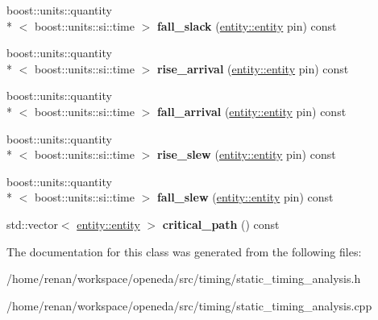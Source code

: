 \begin{DoxyCompactItemize}
\item 
\hypertarget{classophidian_1_1timing_1_1static__timing__analysis_a88ea07d77802e1c5293d17072092f7ab}{boost\-::units\-::quantity\\*
$<$ boost\-::units\-::si\-::time $>$ {\bfseries fall\-\_\-slack} (\hyperlink{classophidian_1_1entity_1_1entity}{entity\-::entity} pin) const }\label{classophidian_1_1timing_1_1static__timing__analysis_a88ea07d77802e1c5293d17072092f7ab}

\item 
\hypertarget{classophidian_1_1timing_1_1static__timing__analysis_a34e95a03213b46d693d4b81e01ea027f}{boost\-::units\-::quantity\\*
$<$ boost\-::units\-::si\-::time $>$ {\bfseries rise\-\_\-arrival} (\hyperlink{classophidian_1_1entity_1_1entity}{entity\-::entity} pin) const }\label{classophidian_1_1timing_1_1static__timing__analysis_a34e95a03213b46d693d4b81e01ea027f}

\item 
\hypertarget{classophidian_1_1timing_1_1static__timing__analysis_a3676fa08af16bda89f50f87722831686}{boost\-::units\-::quantity\\*
$<$ boost\-::units\-::si\-::time $>$ {\bfseries fall\-\_\-arrival} (\hyperlink{classophidian_1_1entity_1_1entity}{entity\-::entity} pin) const }\label{classophidian_1_1timing_1_1static__timing__analysis_a3676fa08af16bda89f50f87722831686}

\item 
\hypertarget{classophidian_1_1timing_1_1static__timing__analysis_af8d770580fd0b1f44033f69e09104f30}{boost\-::units\-::quantity\\*
$<$ boost\-::units\-::si\-::time $>$ {\bfseries rise\-\_\-slew} (\hyperlink{classophidian_1_1entity_1_1entity}{entity\-::entity} pin) const }\label{classophidian_1_1timing_1_1static__timing__analysis_af8d770580fd0b1f44033f69e09104f30}

\item 
\hypertarget{classophidian_1_1timing_1_1static__timing__analysis_a620ad4f9d3a607ce75edca47b7ea956b}{boost\-::units\-::quantity\\*
$<$ boost\-::units\-::si\-::time $>$ {\bfseries fall\-\_\-slew} (\hyperlink{classophidian_1_1entity_1_1entity}{entity\-::entity} pin) const }\label{classophidian_1_1timing_1_1static__timing__analysis_a620ad4f9d3a607ce75edca47b7ea956b}

\item 
\hypertarget{classophidian_1_1timing_1_1static__timing__analysis_a6418e56da1d5cf82326a56ca8d071e9f}{std\-::vector$<$ \hyperlink{classophidian_1_1entity_1_1entity}{entity\-::entity} $>$ {\bfseries critical\-\_\-path} () const }\label{classophidian_1_1timing_1_1static__timing__analysis_a6418e56da1d5cf82326a56ca8d071e9f}

\end{DoxyCompactItemize}


The documentation for this class was generated from the following files\-:\begin{DoxyCompactItemize}
\item 
/home/renan/workspace/openeda/src/timing/static\-\_\-timing\-\_\-analysis.\-h\item 
/home/renan/workspace/openeda/src/timing/static\-\_\-timing\-\_\-analysis.\-cpp\end{DoxyCompactItemize}
